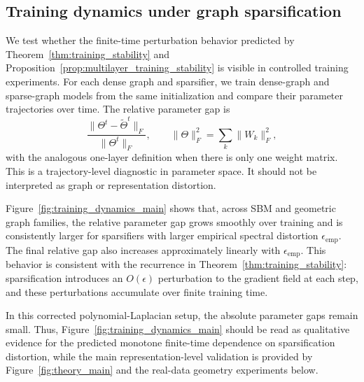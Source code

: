 \documentclass{article}
\begin{document}
\subsection{Training dynamics under graph sparsification}
\label{subsec:training_dynamics_main}


We test whether the finite-time perturbation behavior predicted by
Theorem~\ref{thm:training_stability} and
Proposition~\ref{prop:multilayer_training_stability} is visible in controlled training experiments.
For each dense graph and sparsifier, we train dense-graph and sparse-graph models from the same initialization and compare their parameter trajectories over time. The relative parameter gap is
\[
\frac{\|\Theta^t-\widetilde\Theta^t\|_F}{\|\Theta^t\|_F},
\qquad
\|\Theta\|_F^2=\sum_k \|W_k\|_F^2,
\]
with the analogous one-layer definition when there is only one weight matrix. This is a trajectory-level diagnostic in parameter space. It should not be interpreted as graph or representation distortion.

Figure~\ref{fig:training_dynamics_main} shows that, across SBM and geometric graph families, the relative parameter gap grows smoothly over training and is consistently larger for sparsifiers with larger empirical spectral distortion \(\epsilon_{\mathrm{emp}}\). The final relative gap also increases approximately linearly with \(\epsilon_{\mathrm{emp}}\). This behavior is consistent with the recurrence in Theorem~\ref{thm:training_stability}: sparsification introduces an \(O(\epsilon)\) perturbation to the gradient field at each step, and these perturbations accumulate over finite training time.

In this corrected polynomial-Laplacian setup, the absolute parameter gaps remain small. Thus, Figure~\ref{fig:training_dynamics_main} should be read as qualitative evidence for the predicted monotone finite-time dependence on sparsification distortion, while the main representation-level validation is provided by Figure~\ref{fig:theory_main} and the real-data geometry experiments below.



\end{document}
